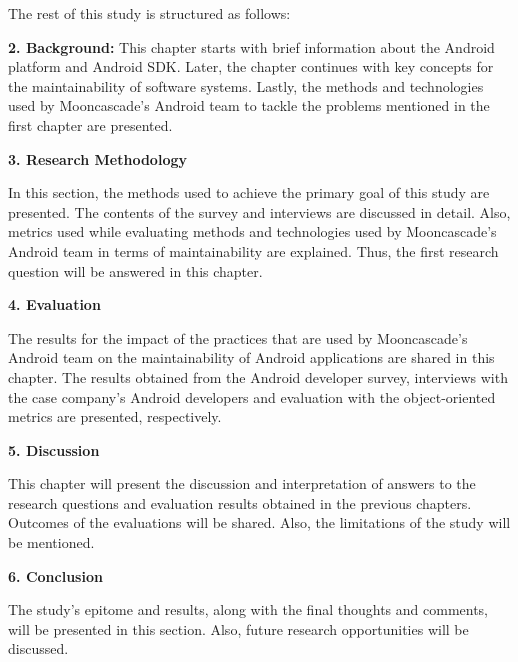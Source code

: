 The rest of this study is structured as follows:

\noindent\textbf{2. Background:}
This chapter starts with brief information about the Android platform and Android SDK. Later, the chapter continues with key concepts for the maintainability of software systems. Lastly, the methods and technologies used by Mooncascade's Android team to tackle the problems mentioned in the first chapter are presented.

\noindent\textbf{3. Research Methodology}

In this section, the methods used to achieve the primary goal of this study are presented. The contents of the survey and interviews are discussed in detail. Also, metrics used while evaluating methods and technologies used by Mooncascade's Android team in terms of maintainability are explained. Thus, the first research question will be answered in this chapter.

\noindent\textbf{4. Evaluation}

The results for the impact of the practices that are used by Mooncascade's Android team on the maintainability of Android applications are shared in this chapter. The results obtained from the Android developer survey, interviews with the case company's Android developers and evaluation with the object-oriented metrics are presented, respectively.

\noindent\textbf{5. Discussion}

This chapter will present the discussion and interpretation of answers to the research questions and evaluation results obtained in the previous chapters. Outcomes of the evaluations will be shared. Also, the limitations of the study will be mentioned.

\noindent\textbf{6. Conclusion}

The study's epitome and results, along with the final thoughts and comments, will be presented in this section. Also, future research opportunities will be discussed.
